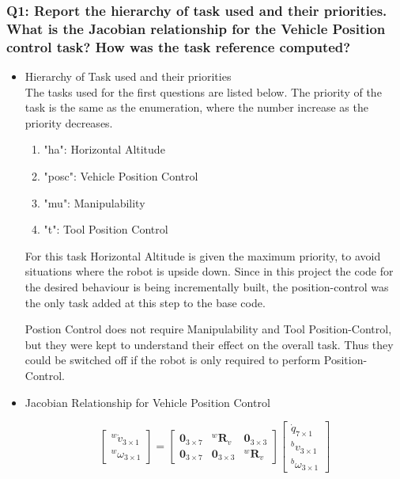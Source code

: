 \documentclass{article}
\begin{document}
\subsubsection{Q1: Report the hierarchy of task used and their priorities. What is the Jacobian relationship for the Vehicle Position control task? How was the task reference computed?}
\begin{itemize}
	\item Hierarchy of Task used and their priorities \\
	 The tasks used for the first questions are listed below. The priority of the task is the same as the enumeration, where the number increase as the priority decreases.
	\begin{enumerate}
		\item "ha": Horizontal Altitude
		\item "posc": Vehicle Position Control 
		\item "mu": Manipulability
		\item "t": Tool Position Control	
	\end{enumerate}
	For this task Horizontal Altitude is given the maximum priority, to avoid situations where the robot is upside down. Since in this project the code for the desired behaviour is being incrementally built, the position-control was the only task added at this step to the base code. 
	
	Postion Control does not require Manipulability and Tool Position-Control, but they were kept to understand their effect on the overall task. Thus they could be switched off if the robot is only required to perform Position-Control. 
	
	\item Jacobian Relationship for Vehicle Position Control 
	
	
	\begin{equation}
	\left[\begin{array}{c}{^{w}\dot{v}_{3 \times 1}} \\ ^{w}{\omega}_{3 \times 1}\end{array}\right]=\left[\begin{array}{ccc}{\mathbf{0}_{3 \times 7}} & {^{w}\boldsymbol{R}_{v}}& {\mathbf{0}_{3 \times 3}} \\ {\mathbf{0}_{3 \times 7}} & {\mathbf{0}_{3 \times 3}} & { ^{w}\boldsymbol{R}_{v}}\end{array}\right]\left[\begin{array}{c}{\dot{q}_{7 \times 1}} \\ ^{b}{v}_{3 \times 1} \\ ^{b}{\omega}_{3 \times 1}\end{array}\right]
	\end{equation}
	

\end{itemize}
\end{document}
